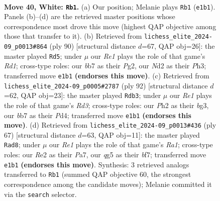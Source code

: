 \documentclass[11pt]{article}
\begin{document}
\clearpage

\begin{figure}[p]\centering
\begin{subfigure}{0.46\textwidth}\centering
\resizebox{\linewidth}{!}{%
\newchessgame
\chessboard[
  setfen={5k2/1b3p2/5np1/6qp/P7/6P1/1p1NRP1P/4R1K1 w - - 0 40},
  showmover=false,
  pgfstyle=straightmove, color=movearrow, markmove={e1-b1}
]}
\caption{}
\end{subfigure}\hfill
\begin{subfigure}{0.46\textwidth}\centering
\resizebox{\linewidth}{!}{%
\newchessgame
\chessboard[
  setfen={8/7p/6pk/p1q5/2P5/1P5P/P5P1/2RR3K w - - 14 46},
  showmover=false,
  pgfstyle=straightmove, color=movearrow, markmove={d1-d5}
]}
\caption{}
\end{subfigure}
\\[4pt]
\begin{subfigure}{0.46\textwidth}\centering
\resizebox{\linewidth}{!}{%
\newchessgame
\chessboard[
  setfen={r1q5/P4ppk/1K1np2p/8/3P4/R2RP1b1/8/8 w - - 8 47},
  showmover=false,
  pgfstyle=straightmove, color=movearrow, markmove={d3-b3}
]}
\caption{}
\end{subfigure}\hfill
\begin{subfigure}{0.46\textwidth}\centering
\resizebox{\linewidth}{!}{%
\newchessgame
\chessboard[
  setfen={r6k/pp3Bpb/3rnp2/7Q/5P2/5NP1/PP5P/6K1 b - - 10 34},
  showmover=false,
  pgfstyle=straightmove, color=movearrow, markmove={a8-d8}
]}
\caption{}
\end{subfigure}
\caption{\textbf{Move 40, White: \texttt{Rb1}.} (a) Our position; Melanie plays \texttt{Rb1} (\texttt{e1b1}). Panels (b)--(d) are the retrieved master positions whose correspondence most drove this move (highest QAP objective among those that transfer to it). (b) Retrieved from \texttt{lichess\_elite\_2024-09\_p0013\#864} (ply 90) [structural distance $d$=67, QAP obj=26]: the master played \texttt{Rd5}; under $\mu$ our \emph{Re1} plays the role of that game's \emph{Rd1}; cross-type roles: our \emph{b}b7 as their \emph{P}g2, our \emph{N}d2 as their \emph{P}h3; transferred move \texttt{e1b1} \textbf{(endorses this move)}. (c) Retrieved from \texttt{lichess\_elite\_2024-09\_p0005\#2787} (ply 92) [structural distance $d$=62, QAP obj=23]: the master played \texttt{Rdb3}; under $\mu$ our \emph{Re1} plays the role of that game's \emph{Rd3}; cross-type roles: our \emph{P}h2 as their \emph{b}g3, our \emph{b}b7 as their \emph{P}d4; transferred move \texttt{e1b1} \textbf{(endorses this move)}. (d) Retrieved from \texttt{lichess\_elite\_2024-09\_p0013\#436} (ply 67) [structural distance $d$=63, QAP obj=11]: the master played \texttt{Rad8}; under $\mu$ our \emph{Re1} plays the role of that game's \emph{Ra1}; cross-type roles: our \emph{R}e2 as their \emph{P}a7, our \emph{q}g5 as their \emph{b}f7; transferred move \texttt{e1b1} \textbf{(endorses this move)}. Synthesis: 3 retrieved analogs transferred to \texttt{Rb1} (summed QAP objective 60, the strongest correspondence among the candidate moves); Melanie committed it via the \texttt{search} selector.}
\label{fig:thought-m78}
\end{figure}
\end{document}
